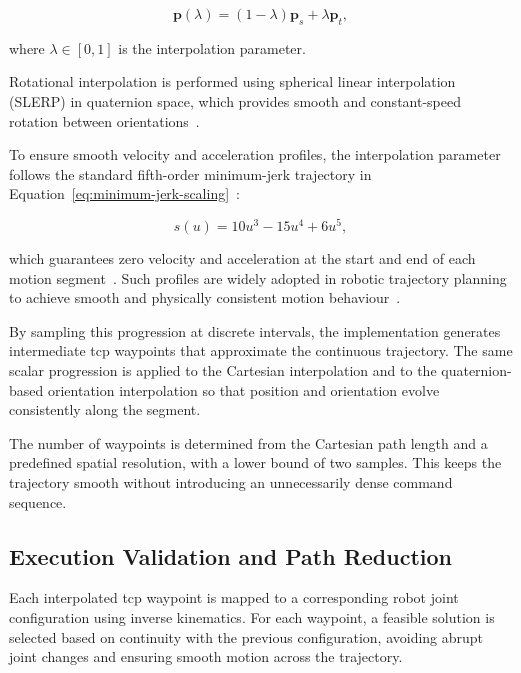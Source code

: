 \begin{equation}
\mathbf{p}(\lambda) = (1 - \lambda)\mathbf{p}_s + \lambda \mathbf{p}_t,
\label{eq:linear-cartesian-interpolation}
\end{equation}

where $\lambda \in [0,1]$ is the interpolation parameter.

Rotational interpolation is performed using spherical linear interpolation (SLERP) in quaternion space, which provides smooth and constant-speed rotation between orientations~\cite{Shoemake1985Slerp}.

To ensure smooth velocity and acceleration profiles, the interpolation parameter follows the standard fifth-order minimum-jerk trajectory in Equation~\ref{eq:minimum-jerk-scaling}~\cite{Flash1985MinimumJerk,Sharkawy2021MinimumJerk}:

\begin{equation}
s(u) = 10u^3 - 15u^4 + 6u^5,
\label{eq:minimum-jerk-scaling}
\end{equation}

which guarantees zero velocity and acceleration at the start and end of each motion segment~\cite{Flash1985MinimumJerk}. Such profiles are widely adopted in robotic trajectory planning to achieve smooth and physically consistent motion behaviour~\cite{Gasparetto2012Trajectory}.

By sampling this progression at discrete intervals, the implementation generates intermediate \ac{tcp} waypoints that approximate the continuous trajectory. The same scalar progression is applied to the Cartesian interpolation and to the quaternion-based orientation interpolation so that position and orientation evolve consistently along the segment.

The number of waypoints is determined from the Cartesian path length and a predefined spatial resolution, with a lower bound of two samples. This keeps the trajectory smooth without introducing an unnecessarily dense command sequence.

\subsection{Execution Validation and Path Reduction}
\label{sec:kinematic-mapping-joint-execution}

Each interpolated \ac{tcp} waypoint is mapped to a corresponding robot joint configuration using inverse kinematics. For each waypoint, a feasible solution is selected based on continuity with the previous configuration, avoiding abrupt joint changes and ensuring smooth motion across the trajectory.


